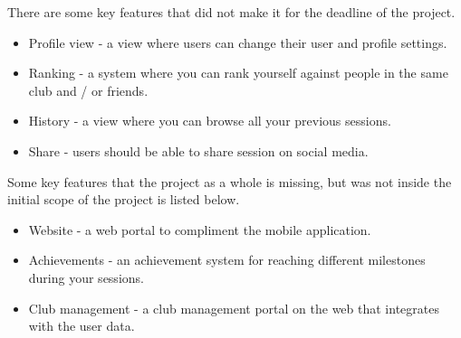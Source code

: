 There are some key features that did not make it for the deadline of the project.
\begin{itemize}  
\item Profile view - a view where users can change their user and profile settings.
\item Ranking - a system where you can rank yourself against people in the same club and / or friends.
\item History - a view where you can browse all your previous sessions.
\item Share - users should be able to share session on social media.
\end{itemize}

Some key features that the project as a whole is missing, but was not inside the initial scope of the project is listed below.
\begin{itemize}  
\item Website - a web portal to compliment the mobile application.
\item Achievements - an achievement system for reaching different milestones during your sessions.
\item Club management - a club management portal on the web that integrates with the user data.
\end{itemize}